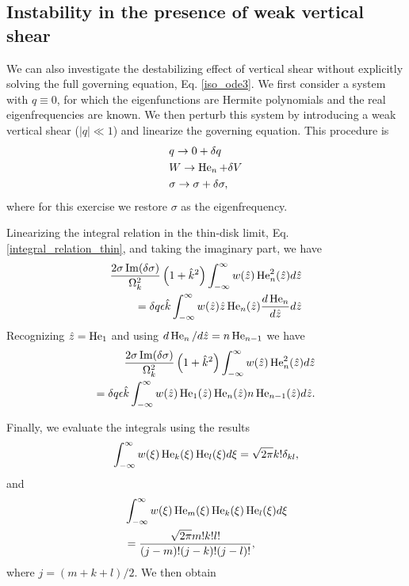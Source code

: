 \subsection{Instability in the presence of weak vertical shear}
We can also investigate the destabilizing effect of vertical shear
without explicitly solving the full governing equation,
Eq. \ref{iso_ode3}. We first
consider a system with $q\equiv0$, for which the eigenfunctions are
Hermite polynomials and the real eigenfrequencies are known. We then
perturb this system by introducing a weak vertical shear ($|q|\ll1$)
and linearize the governing equation. This procedure is
\begin{align}   
  &q \to 0 + \delta q\\
  &W \to \operatorname{He}_n + \delta V \\
  &\sigma \to \sigma + \delta\sigma, 
\end{align}
where for this exercise we restore $\sigma$ as the eigenfrequency. 

Linearizing the integral relation in the thin-disk limit, Eq. \ref{integral_relation_thin}, and taking the
imaginary part, we have
\begin{align}
  \frac{2\sigma\operatorname{Im}(\delta\sigma)}{\Omega_k^2}
  \left(1+\hat{k}^2\right) \int_{-\infty}^{\infty} w(\hat{z})
  \operatorname{He}_n^2(\hat{z}) d\hat{z} \notag\\
  = \delta q \epsilon \hat{k} 
  \int_{-\infty}^{\infty}
  w(\hat{z})\hat{z}\operatorname{He}_n(\hat{z})\frac{d\operatorname{He}_n}{d\hat{z}} d\hat{z}
\end{align}
Recognizing $\hat{z} = \operatorname{He}_1$ and using $d\operatorname{He}_n/d\hat{z} = n
\operatorname{He}_{n-1}$ we have
 \begin{align}
   \frac{2\sigma\operatorname{Im}(\delta\sigma)}{\Omega_k^2}
   \left(1+\hat{k}^2\right) \int_{-\infty}^{\infty} w(\hat{z})
   \operatorname{He}_n^2(\hat{z}) d\hat{z} \notag\\
   =\delta q \epsilon \hat{k} 
   \int_{-\infty}^{\infty}
   w(\hat{z})\operatorname{He}_1(\hat{z})\operatorname{He}_n(\hat{z})n\operatorname{He}_{n-1}(\hat{z})d\hat{z}. 
 \end{align}

Finally, we evaluate the integrals using the results
\begin{align}
  \int_{-\infty}^{\infty}
  w(\xi) \operatorname{He}_k(\xi)\operatorname{He}_l(\xi) d\xi = \sqrt{2\pi}k!\delta_{kl}, 
\end{align}
and
\begin{align}
  &\int_{-\infty}^{\infty}
  w(\xi) \operatorname{He}_m(\xi)\operatorname{He}_k(\xi)\operatorname{He}_l(\xi) d\xi\notag\\& =
  \frac{\sqrt{2\pi}m!k!l!}{(j-m)!(j-k)!(j-l)!}, 
\end{align}
where $j = (m+k+l)/2$. We then obtain


